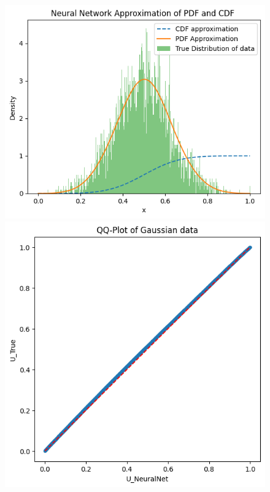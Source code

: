 \begin{figure}
    \centering
    \begin{minipage}{0.45\textwidth}
        \centering
        \begin{minipage}{0.48\textwidth}
            \centering
            \includegraphics[width=\textwidth]{5ResultsDiscussion/pictures/MarginalTest/NormalHistogram.png}
        \end{minipage}
        \hfill
        \begin{minipage}{0.48\textwidth}
            \centering
            \includegraphics[width=\textwidth]{5ResultsDiscussion/pictures/MarginalTest/NormalQQ.png}

\end{minipage}
\end{minipage}
\end{figure}
